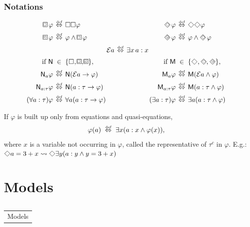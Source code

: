 \documentclass[xcolor=x11names]{beamer}
\makeatletter
\let\beamer@writeslidentry@miniframeson=\beamer@writeslidentry
\def\beamer@writeslidentry@miniframesoff{%
  \expandafter\beamer@ifempty\expandafter{\beamer@framestartpage}{}%
  {%
    \clearpage\beamer@notesactions%
  }
}
\newcommand*{\miniframeson}{\let\beamer@writeslidentry=\beamer@writeslidentry@miniframeson}
\newcommand*{\miniframesoff}{\let\beamer@writeslidentry=\beamer@writeslidentry@miniframesoff}
\newcommand{\cimdia}[1] {\miniframesoff \begin{frame}\begin{center}\huge \begin{tabular}{c}#1\end{tabular}\end{center}\end{frame}\miniframeson}
\newcommand{\szakasz}[2][]{\section{#1}\subsection{}\cimdia{#2}}
\newcommand{\Boxi}[1][]{\Box_{#1}}
\newcommand{\BBox}[1][]{\mathop{\raisebox{.3ex}{\scalebox{.6}{$\Box$}} \hspace{-1.325ex}\Box_{#1} \hspace{-.25ex}}}
\newcommand{\BBoxDot}[1][]{\mathop{\raisebox{.2ex}{$\cdot$} \hspace{-1.175ex} \BBox[#1]}}
\renewcommand{\Diamond}{\scalebox{.9}{\raisebox{-.4ex}{\rotatebox{45}{$\Box$}}}}
\newcommand{\DDiamond}{\mathop{\scalebox{.9}{\raisebox{-.4ex}{\rotatebox{45}{$\Box \hspace{-1.325ex}\raisebox{.3ex}{\scalebox{.6}{$\Box$}}$}}}}}
\newcommand{\DDiamondDot}{\mathop{\DDiamond \hspace{-1.45ex} \raisebox{.1ex}{$\cdot$}\hspace{.45ex}}}
\newcommand{\defekv}[1][.1]{\hspace{#1cm}\overset{\textup{\tiny def}}{ \Leftrightarrow }\hspace{#1cm}}
\newcommand{\lthen}{\rightarrow}
\newenvironment{tomb}[2][.1]{\arraycolsep=#1cm\begin{array}{#2}}{\end{array}}
\makeatother
\begin{document}
\begin{frame}[t]
\frametitle{Notations}
\footnotesize
\def\sortav{.5em}
\[ \begin{tomb}[.02]{rclrclrcl}
        \BBox \varphi &\defekv &\Box \Box \varphi
        &&&& \DDiamond \varphi &\defekv &\Diamond \Diamond \varphi
\\[\sortav] \BBoxDot \varphi &\defekv& \varphi \land \BBox \varphi
        &&&&\DDiamondDot \varphi &\defekv& \varphi \land \DDiamond \varphi
\\[\sortav] &&&\mathcal E a &\defekv & \exists x \, a:x &
\\[\sortav] \textup{ if }\mathsf N &\in & \{\Boxi ,\BBox, \BBoxDot\},
        &&&& \textup{ if }\mathsf M&\in & \{\Diamond ,\DDiamond, \DDiamondDot\},
\\[\sortav] \mathsf N_a \varphi &\defekv& \mathsf N (\mathcal Ea\lthen \varphi)
        &&&& \mathsf M_a \varphi &\defekv& \mathsf M (\mathcal Ea\land \varphi)
\\[\sortav] \mathsf N_{a:\tau} \varphi &\defekv& \mathsf N (a:\tau\lthen \varphi)
        &&&& \mathsf M_{a:\tau} \varphi &\defekv& \mathsf M (a:\tau\land \varphi)
\\[\sortav] (\forall a:\tau)\varphi &\defekv & \forall a (a:\tau \lthen \varphi)
        &&&&(\exists a:\tau)\varphi &\defekv & \exists a (a:\tau \land \varphi)
\end{tomb}\]

If $\varphi$ is built up only from equations and quasi-equations,
\[\varphi(a) \defekv  \exists x (a:x \land \varphi(x)),\]
where $x$ is a variable not occurring in $\varphi$, called the representative of $\tau^c$ in $\varphi$. E.g.:
$\Diamond a = 3+x \rightsquigarrow \Diamond \exists y (a:y \land y = 3+x) $
\end{frame}




\szakasz[Models]{Models}
\end{document}
